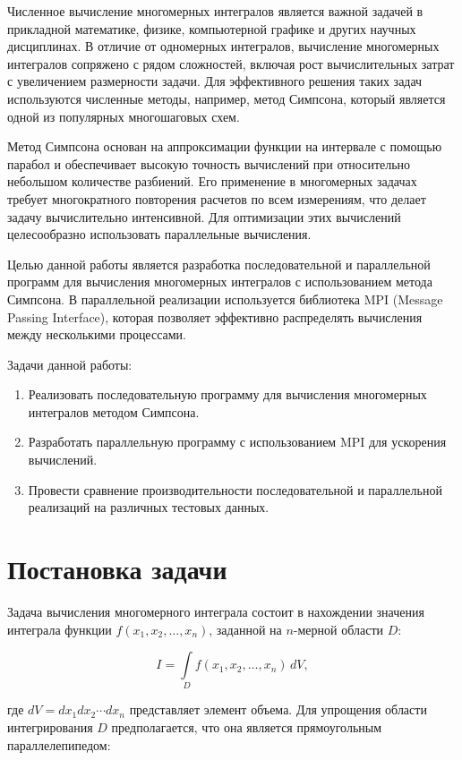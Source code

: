 \documentclass{report}
\begin{document}
Численное вычисление многомерных интегралов является важной задачей в прикладной математике, физике, компьютерной графике и других научных дисциплинах. В отличие от одномерных интегралов, вычисление многомерных интегралов сопряжено с рядом сложностей, включая рост вычислительных затрат с увеличением размерности задачи. Для эффективного решения таких задач используются численные методы, например, метод Симпсона, который является одной из популярных многошаговых схем.

Метод Симпсона основан на аппроксимации функции на интервале с помощью парабол и обеспечивает высокую точность вычислений при относительно небольшом количестве разбиений. Его применение в многомерных задачах требует многократного повторения расчетов по всем измерениям, что делает задачу вычислительно интенсивной. Для оптимизации этих вычислений целесообразно использовать параллельные вычисления.

Целью данной работы является разработка последовательной и параллельной программ для вычисления многомерных интегралов с использованием метода Симпсона. В параллельной реализации используется библиотека MPI (Message Passing Interface), которая позволяет эффективно распределять вычисления между несколькими процессами.

Задачи данной работы:
\begin{enumerate}
    \item Реализовать последовательную программу для вычисления многомерных интегралов методом Симпсона.
    \item Разработать параллельную программу с использованием MPI для ускорения вычислений.
    \item Провести сравнение производительности последовательной и параллельной реализаций на различных тестовых данных.
\end{enumerate}

\newpage

\section*{Постановка задачи}  

Задача вычисления многомерного интеграла состоит в нахождении значения интеграла функции \( f(x_1, x_2, \ldots, x_n) \), заданной на \( n \)-мерной области \( D \):

\[
I = \int\limits_{D} f(x_1, x_2, \ldots, x_n) \, dV,
\]

где \( dV = dx_1 dx_2 \cdots dx_n \) представляет элемент объема. Для упрощения области интегрирования \( D \) предполагается, что она является прямоугольным параллелепипедом:
\end{document}
